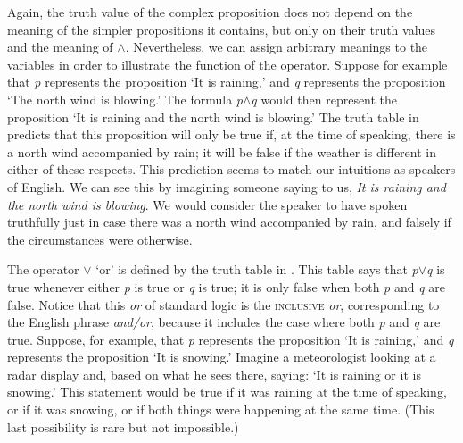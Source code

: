 Again, the truth value of the complex proposition does not depend on the meaning of the simpler propositions it contains, but only on their truth values and the meaning of \textit{$\wedge$}. Nevertheless, we can assign arbitrary meanings to the variables in order to illustrate the function of the operator. Suppose for example that \textit{p} represents the proposition ‘It is raining,’ and \textit{q} represents the proposition ‘The north wind is blowing.’ The formula \textit{p$\wedge$}\textit{q} would then represent the proposition ‘It is raining and the north wind is blowing.’ The truth table in  predicts that this proposition will only be true if, at the time of speaking, there is a north wind accompanied by rain; it will be false if the weather is different in either of these respects. This prediction seems to match our intuitions as speakers of English. We can see this by imagining someone saying to us, \textit{It is raining and the north wind is blowing}. We would consider the speaker to have spoken truthfully just in case there was a north wind accompanied by rain, and falsely if the circumstances were otherwise.



The operator $\vee$ ‘or’ is defined by the truth table in . This table says that \textit{p}$\vee$\textit{q} is true whenever either \textit{p} is true or \textit{q} is true; it is only false when both \textit{p} and \textit{q} are false. Notice that this \textit{or} of standard logic is the \textsc{inclusive} \textit{or}, corresponding to the English phrase \textit{and/or}, because it includes the case where both \textit{p} and \textit{q} are true. Suppose, for example, that \textit{p} represents the proposition ‘It is raining,’ and \textit{q} represents the proposition ‘It is snowing.’ Imagine a meteorologist looking at a radar display and, based on what he sees there, saying: ‘It is raining or it is snowing.’ This statement would be true if it was raining at the time of speaking, or if it was snowing, or if both things were happening at the same time. (This last possibility is rare but not impossible.)



